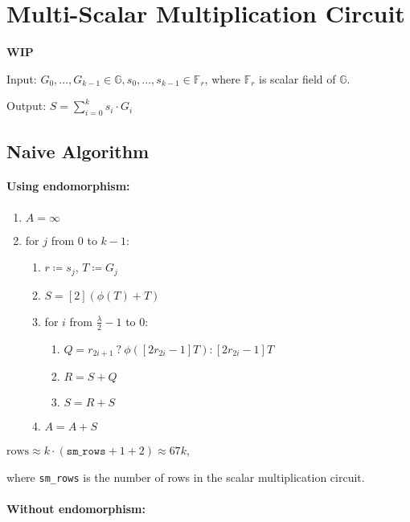 \section{Multi-Scalar Multiplication Circuit}
\label{section:msm}
\textbf{WIP}

Input: $G_0, ..., G_{k - 1} \in \mathbb{G}, s_0, ..., s_{k - 1} \in \mathbb{F}_r$, where $\mathbb{F}_r$ is scalar field of $\mathbb{G}$.


Output: $S = \sum\limits_{i = 0}^{k}s_i \cdot G_i$

\subsection{Naive Algorithm}

\paragraph{Using endomorphism:}

\begin{enumerate}
    \item $A = \infty$
    \item for $j$ from $0$ to $k-1$:
    \begin{enumerate}
        \item $r \coloneqq s_j$, $T \coloneqq G_j$
        \item $S = [2](\phi(T) + T)$
        \item for $i$ from $\frac{\lambda}{2} - 1$ to $0$:
        \begin{enumerate}
            \item $Q = r_{2i + 1} \: ? \: \phi([2r_{2i} - 1]T) : [2r_{2i} - 1]T$
            \item $R = S + Q$
            \item $S = R + S$
        \end{enumerate}
        \item $A = A + S$
    \end{enumerate}
\end{enumerate}

\begin{center}
    $\text{rows} \approx k \cdot (\texttt{sm\_rows} + 1 + 2) \approx 67k$,
\end{center}
where \texttt{sm\_rows} is the number of rows in the scalar multiplication circuit.

\paragraph{Without endomorphism:}

